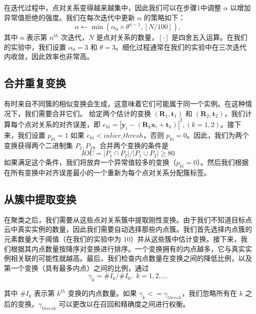 在迭代过程中，点对关系变得越来越集中，因此我们可以在步骤1中调整 $\alpha$ 以增加异常值拒绝的强度。我们在每次迭代中更新 $\alpha$ 的策略如下：
\begin{equation}
\alpha \leftarrow \min(\alpha _0\times \theta ^{n-1},\left[N/100 \right] ),
\label{eq:alpha}
\end{equation}
其中 $n$ 表示第 $n^{th}$ 次迭代，$N$ 是点对关系的数量，$\left[ \cdot \right]$ 是四舍五入运算。在我们的实验中，我们设置 $\alpha_0 = 3$ 和 $\theta = 3$。细化过程通常在我们的实验中在三次迭代内收敛，因此效率也非常高。

\subsection{合并重复变换}
有时来自不同簇的相似变换会生成，这意味着它们可能属于同一个实例。在这种情况下，我们需要合并它们。
给定两个估计的变换 $(\boldsymbol{R}_1, \boldsymbol{t}_1)$ 和 $(\boldsymbol{R}_2, \boldsymbol{t}_2)$，我们计算每个点对关系的对齐误差，即 $e_{ki} = |\boldsymbol{y}_{i}-(\boldsymbol{R}_k \boldsymbol{x}_{i} + \boldsymbol{t}_k)|^2, (k = 1,2)$。接下来，我们设置 $p_{ki} = 1$ 如果 $e_{ki} < inlier\_thresh$，否则 $p_{ki}=0$。因此，我们为两个变换获得两个二进制集 $P_1, P_2$。合并两个变换的条件是
\begin{equation}
IOU = |P_1 \cap P_2|/|P_1 \cup P_2| \geq 80%
\label{eq:iou}
\end{equation}
如果满足这个条件，我们将放弃一个异常值较多的变换（$p_{ki} = 0$）。然后我们根据在所有变换中对齐误差最小的一个重新为每个点对关系分配簇标签。

\subsection{从簇中提取变换}
在聚类之后，我们需要从这些点对关系簇中提取刚性变换。由于我们不知道目标点云中真实实例的数量，因此我们需要自动选择那些内点簇。我们首先选择内点簇的元素数量大于阈值（在我们的实验中为 $10$）并从这些簇中估计变换。接下来，我们根据其内点数量按降序对变换进行排序。一个变换拥有的内点越多，它与真实实例相关联的可能性就越高。最后，我们检查内点数量在变换之间的降低比例，以及第一个变换（具有最多内点）之间的比例，通过
\begin{equation}
    \gamma_k = \#I_{k}/\#I_{0},\,\, k = 1,2,\ldots
\end{equation}

其中 $\#I_k$ 表示第 $k^{th}$ 变换的内点数量。如果 $\gamma_k <= \gamma_{thresh}$，我们忽略所有在 $k$ 之后的变换。$\gamma_{thresh}$ 可以更改以在召回和精确度之间进行权衡。

